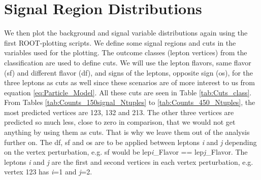\documentclass[a4paper, american, 12pt]{report}
\begin{document}
	\section{Signal Region Distributions}
	\label{sect:Result-SRDist}
	We then plot the background and signal variable distributions again using the first ROOT-plotting scripts. We define some signal regions and cuts in the variables used for the plotting. The outcome classes (lepton vertices) from the classification are used to define cuts. We will use the lepton flavors, same flavor (\acrshort{sf}) and different flavor (\acrshort{df}), and signs of the leptons, opposite sign (\acrshort{os}), for the three leptons as cuts as well since these scenarios are of more interest to us from equation \ref{eq:Particle_Model}. All these cuts are seen in Table \ref{tab:Cuts_class}. From Tables \ref{tab:Counts_150signal_Ntuples} to \ref{tab:Counts_450_Ntuples}, the most predicted vertices are 123, 132 and 213. The other three vertices are predicted so much less, close to zero in comparison, that we would not get anything by using them as cuts. That is why we leave them out of the analysis further on. The \acrshort{df}, \acrshort{sf} and \acrshort{os} are to be applied between leptons \textit{i} and \textit{j} depending on the vertex perturbation, e.g. \acrshort{sf} would be lep\textit{i}\_Flavor == lep\textit{j}\_Flavor. The leptons \textit{i} and \textit{j} are the first and second vertices in each vertex perturbation, e.g. vertex 123 has \textit{i}=1 and \textit{j}=2.
	
\end{document}

